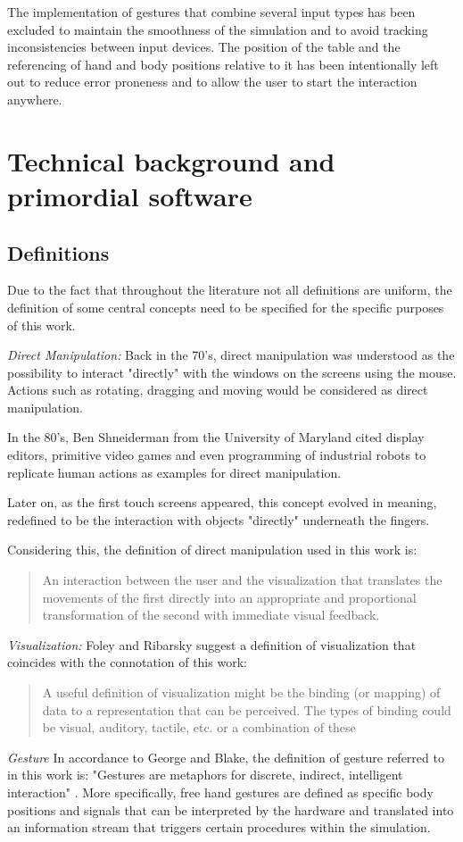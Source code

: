 \documentclass[12pt]{extarticle}
\begin{document}
The implementation of gestures that combine several input types has been excluded to maintain the smoothness of the simulation and to avoid tracking inconsistencies between input devices. The position of the table and the referencing of hand and body positions relative to it has been intentionally left out to reduce error proneness and to allow the user to start the interaction anywhere.

\section{Technical background and primordial software}\label{sec:AV}
\subsection{Definitions}
Due to the fact that throughout the literature not all definitions are uniform, the definition of some central concepts need to be specified for the specific purposes of this work.

\emph{Direct Manipulation:} Back in the 70's, direct manipulation was understood as the possibility to interact "directly" with the windows on the screens using the mouse. Actions such as rotating, dragging and moving would be considered as direct manipulation.

In the 80's, Ben Shneiderman from the University of Maryland \cite{DirManSh} cited display editors, primitive video games and even programming of industrial robots to replicate human actions as examples for direct manipulation.

Later on, as the first touch screens appeared, this concept evolved in meaning, redefined to be the interaction with objects "directly" underneath the fingers.

Considering this, the definition of direct manipulation used in this work is:
\begin{quotation}
An interaction between the user and the visualization that translates the movements of the first directly into an appropriate and proportional transformation of the second with immediate visual feedback.
\end{quotation}

\emph{Visualization:} Foley and Ribarsky suggest a definition of visualization that coincides with the connotation of this work: \cite{FoleyVisualization}

\begin{quotation}A useful definition of visualization might be the binding (or mapping) of data to a representation that can be perceived. The types of binding could be visual, auditory, tactile, etc. or a combination of these
\end{quotation}
\emph{Gesture} In accordance to George and Blake, the definition of gesture referred to in this work is: "Gestures are metaphors for discrete, indirect, intelligent interaction" \cite{GestureDef}. More specifically, free hand gestures are defined as specific body positions and signals that can be interpreted by the hardware and translated into an information stream that triggers certain procedures within the simulation.
\end{document}
